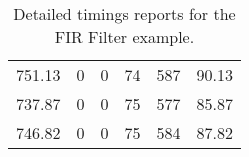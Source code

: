 \begin{table}[h]
{\begin{tabular}{cccccc}
            751.13             & 0                          & 0                          & 74                         & 587                        & 90.13                  \\
            737.87             & 0                          & 0                          & 75                         & 577                        & 85.87                  \\
            746.82             & 0                          & 0                          & 75                         & 584                        & 87.82                  \\
            \bottomrule
        \end{tabular}
    }
    \caption{Detailed timings reports for the FIR Filter example.}
\end{table}





